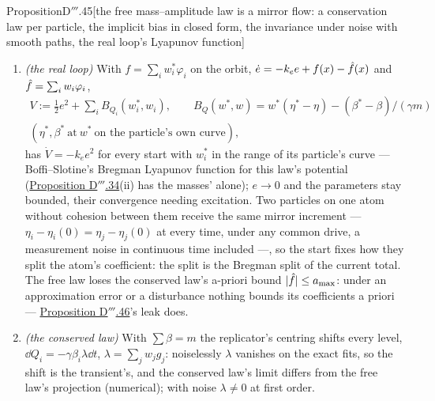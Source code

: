 \begin{thm}{Proposition}{D$'''$.45}[the free mass--amplitude law is a mirror flow: a conservation law per particle, the
implicit bias in closed form, the invariance under noise with smooth paths, the real loop's Lyapunov
function]
\begin{enumerate}[label=\textup{(\roman*)}]
    pursuit ($\norm w_1$ rising), then atoms die ($Q\to-c$) and it settles on a sparse exact fit --- basis pursuit's where
    basis pursuit is the truth; where it is not, basis pursuit's support or another sparse fit of larger $\ell^1$ norm
    (numerical). The mirror update --- $\eta^+ = \eta + hg$, the particle placed on its own curve, an exact
    zero-order-hold integration of each particle --- keeps $Q$ and the projection exactly at every step, whatever the
    noise: which update the loop runs decides whether its measurement noise selects. (c) Dither on the amplitudes
    ($\dd\alpha$ gains $\sqrt{2\tau G_\alpha}\dd B$) drifts $Q$:
    $\dd Q_i = -\gamma\tau\cosh(2\alpha_i/a_{\max})\dd t + \dd M_i$ ($M$ a martingale), so $Q$ falls without bound in
    expectation while the amplitudes diffuse into their saturation, where the masses carry the coefficients with frozen
    signs --- the free law's form of \hyperref[res:thmDppp:37]{Proposition D$'''$.37}'s drive into the saturation.
  \item \emph{(the real loop)} With $f = \sum_iw^*_i\varphi_i$ on the orbit, $\dot e = -k_ee + f(x) - \hat f(x)$ and
    $\hat f = \sum_iw_i\varphi_i$,
    \begin{gather*}
      V := \tfrac12e^2 + \sum_iB_{Q_i}(w^*_i,w_i),\qquad
      B_Q(w^*,w) = w^*(\eta^* - \eta) - (\beta^* - \beta)/(\gamma m)\\
      (\eta^*,\beta^*\ \text{at}\ w^*\ \text{on the particle's own curve}),
    \end{gather*}
    has $\dot V = -k_ee^2$ for every start with $w^*_i$ in the range of its particle's curve --- Boffi--Slotine's Bregman
    Lyapunov function for this law's potential (\hyperref[res:thmDppp:34]{Proposition D$'''$.34}(ii) has the masses'
    alone); $e\to0$ and the parameters stay bounded, their convergence needing excitation. Two particles on one atom
    without cohesion between them receive the same mirror increment --- $\eta_i - \eta_i(0) = \eta_j - \eta_j(0)$ at
    every time, under any common drive, a measurement noise in continuous time included ---, so the start fixes how they
    split the atom's coefficient: the split is the Bregman split of the current total. The free law loses the conserved
    law's a-priori bound $\lvert \hat f\rvert\le a_{\max}$: under an approximation error or a disturbance nothing bounds its
    coefficients a priori --- \hyperref[res:thmDppp:46]{Proposition D$'''$.46}'s leak does.
  \item \emph{(the conserved law)} With $\sum\beta = m$ the replicator's centring shifts every level,
    $\dd Q_i = -\gamma\beta_i\lambda\dd t$, $\lambda = \sum_jw_jg_j$: noiselessly $\lambda$ vanishes on the exact fits,
    so the shift is the transient's, and the conserved law's limit differs from the free law's projection (numerical);
    with noise $\lambda\ne0$ at first order.
\end{enumerate}
\end{thm}

